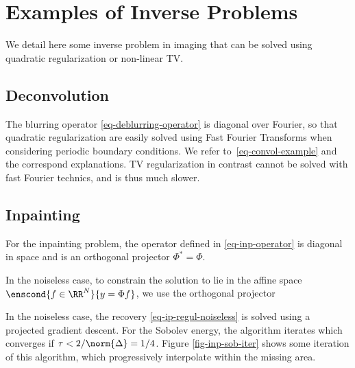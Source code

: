 \section{Examples of Inverse Problems}

We detail here some inverse problem in imaging that can be solved using quadratic regularization or non-linear TV.

\subsection{Deconvolution}
\label{subsec-deconv}

The blurring operator \eqref{eq-deblurring-operator} is diagonal over Fourier, so that quadratic regularization are easily solved using Fast Fourier Transforms when considering periodic boundary conditions. We refer to~\eqref{eq-convol-example} and the correspond explanations. TV regularization in contrast cannot be solved with fast Fourier technics, and is thus much slower.


\subsection{Inpainting}
\label{sec-inpainting-variational}

For the inpainting problem, the operator defined in \eqref{eq-inp-operator} is diagonal in space
and is an orthogonal projector $\Phi^* = \Phi$.

In the noiseless case, to constrain the solution to lie in the affine space $\enscond{f \in \RR^N}{y=\Phi f}$, we use the orthogonal projector


In the noiseless case, the recovery \eqref{eq-ip-regul-noiseless} is solved using a projected gradient descent.
For the Sobolev energy, the algorithm iterates
which converges if $\tau < 2 / \norm{\Delta} = 1/4$. Figure \ref{fig-inp-sob-iter} shows some iteration of this algorithm, which progressively interpolate within the missing area. 

